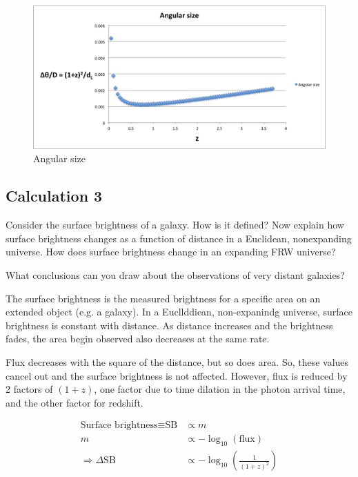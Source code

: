 \documentclass[a4paper]{article} %
\begin{document}
\begin{figure}[h]
\centering
\includegraphics[width=\textwidth]{images/angular-size.png}
\caption{Angular size}
\label{fig:angular size}
\end{figure}


\subsection{Calculation 3}
\begin{framed}
Consider the surface brightness of a galaxy. How is it defined? Now explain how surface brightness changes as a function of distance in a Euclidean, nonexpanding universe. How does surface brightness change in an expanding FRW universe?

What conclusions can you draw about the observations of very distant galaxies?
\end{framed}

The surface brightness is the measured brightness for a specific area on an extended object (e.g. a galaxy). In a Eucllddiean, non-expanindg universe, surface brightness is constant with distance. As distance increases and the brightness fades, the area begin observed also decreases at the same rate.

Flux decreases with the square of the distance, but so does area. So, these values cancel out and the surface brightness is not affected. However, flux is reduced by 2 factors of $(1+z)$, one factor due to time dilation in the photon arrival time, and the other factor for redshift.

\begin{align}
\text{Surface brightness}\equiv\text{SB}&\propto m\\
m & \propto -\log_{10}(\text{flux})\\
\Rightarrow \Delta\text{SB}&\propto -\log_{10}\left(\frac{1}{(1+z)^2}\right)
\end{align}
\end{document}
